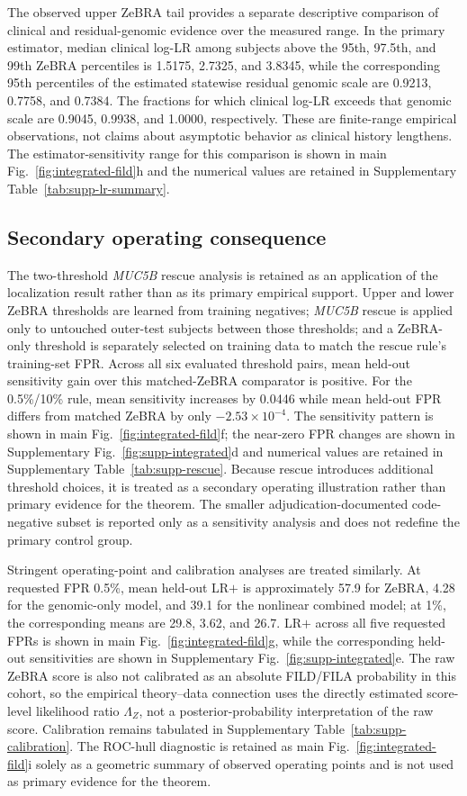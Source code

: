 The observed upper ZeBRA tail provides a separate descriptive comparison of clinical and residual-genomic evidence over the measured range. In the primary estimator, median clinical log-LR among subjects above the 95th, 97.5th, and 99th ZeBRA percentiles is 1.5175, 2.7325, and 3.8345, while the corresponding 95th percentiles of the estimated statewise residual genomic scale are 0.9213, 0.7758, and 0.7384. The fractions for which clinical log-LR exceeds that genomic scale are 0.9045, 0.9938, and 1.0000, respectively. These are finite-range empirical observations, not claims about asymptotic behavior as clinical history lengthens. The estimator-sensitivity range for this comparison is shown in main Fig.~\ref{fig:integrated-fild}h and the numerical values are retained in Supplementary Table~\ref{tab:supp-lr-summary}.

\subsection{Secondary operating consequence}
The two-threshold \textit{MUC5B} rescue analysis is retained as an application of the localization result rather than as its primary empirical support. Upper and lower ZeBRA thresholds are learned from training negatives; \textit{MUC5B} rescue is applied only to untouched outer-test subjects between those thresholds; and a ZeBRA-only threshold is separately selected on training data to match the rescue rule's training-set FPR. Across all six evaluated threshold pairs, mean held-out sensitivity gain over this matched-ZeBRA comparator is positive. For the 0.5\%/10\% rule, mean sensitivity increases by 0.0446 while mean held-out FPR differs from matched ZeBRA by only $-2.53\times10^{-4}$. The sensitivity pattern is shown in main Fig.~\ref{fig:integrated-fild}f; the near-zero FPR changes are shown in Supplementary Fig.~\ref{fig:supp-integrated}d and numerical values are retained in Supplementary Table~\ref{tab:supp-rescue}. Because rescue introduces additional threshold choices, it is treated as a secondary operating illustration rather than primary evidence for the theorem. The smaller adjudication-documented code-negative subset is reported only as a sensitivity analysis and does not redefine the primary control group.

Stringent operating-point and calibration analyses are treated similarly. At requested FPR 0.5\%, mean held-out LR$+$ is approximately 57.9 for ZeBRA, 4.28 for the genomic-only model, and 39.1 for the nonlinear combined model; at 1\%, the corresponding means are 29.8, 3.62, and 26.7. LR$+$ across all five requested FPRs is shown in main Fig.~\ref{fig:integrated-fild}g, while the corresponding held-out sensitivities are shown in Supplementary Fig.~\ref{fig:supp-integrated}e. The raw ZeBRA score is also not calibrated as an absolute FILD/FILA probability in this cohort, so the empirical theory--data connection uses the directly estimated score-level likelihood ratio $\Lambda_Z$, not a posterior-probability interpretation of the raw score. Calibration remains tabulated in Supplementary Table~\ref{tab:supp-calibration}. The ROC-hull diagnostic is retained as main Fig.~\ref{fig:integrated-fild}i solely as a geometric summary of observed operating points and is not used as primary evidence for the theorem.
